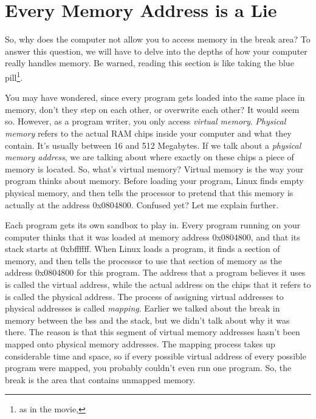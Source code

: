 \section{Every Memory Address is a Lie}

So, why does the computer not allow you to access memory in the 
break area?  To answer this question, we will have to delve into
the depths of how your computer really handles memory.  Be warned,
reading this section is like taking the blue pill\footnote{as
in the movie, }.

You may have wondered, since every program gets loaded into the same
place in memory, don't they step on each other, or overwrite each other?
It would seem so.  However, as a program writer, you only access
\emph{virtual memory}.  \emph{Physical memory}
refers to the actual RAM chips inside your computer and what they contain.   It's usually
between 16 and 512 Megabytes.  If we talk about a \emph{physical
memory address}, we are talking about where exactly on these
chips a piece of memory is located.  So, what's virtual memory?  Virtual
memory is the way your program thinks about memory.  Before loading
your program, Linux finds empty physical memory, and then tells
the processor to pretend that this memory is actually at the address
0x0804800.  Confused yet?  Let me explain further.

Each program gets its own sandbox to play in.  Every program running
on your computer thinks that it was loaded at memory address 0x0804800,
and that its stack starts at 0xbffffff.  When Linux loads a program,
it finds a section of memory, and then tells the processor to use
that section of memory as the address 0x0804800 for this program.  The
address that a program believes it uses is called the virtual address,
while the actual address on the chips that it refers to is called
the physical address.  The process of assigning virtual addresses to
physical addresses is called \emph{mapping}.  Earlier we 
talked about the break in memory between the bss and the stack, but
we didn't talk about why it was there.  The reason is that this
segment of virtual memory addresses hasn't been mapped onto 
physical memory addresses.  The mapping process takes up considerable
time and space, so if every possible virtual address of every possible
program were mapped, you probably couldn't even run one program.  So,
the break is the area that contains unmapped memory.

